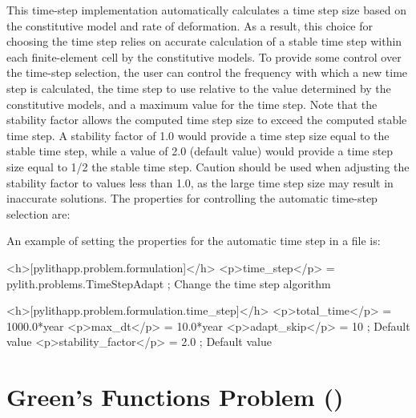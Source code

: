 This time-step implementation automatically calculates a time step
size based on the constitutive model and rate of deformation. As a
result, this choice for choosing the time step relies on accurate
calculation of a stable time step within each finite-element cell
by the constitutive models. To provide some control over the time-step
selection, the user can control the frequency with which a new time
step is calculated, the time step to use relative to the value determined
by the constitutive models, and a maximum value for the time step.
Note that the stability factor allows the computed time step size
to exceed the computed stable time step. A stability factor of 1.0
would provide a time step size equal to the stable time step, while
a value of 2.0 (default value) would provide a time step size equal
to 1/2 the stable time step. Caution should be used when adjusting
the stability factor to values less than 1.0, as the large time step
size may result in inaccurate solutions. The properties for controlling
the automatic time-step selection are:
\begin{inventory}
\end{inventory}
An example of setting the properties for the automatic time step in
a  file is:
\begin{cfg}
<h>[pylithapp.problem.formulation]</h>
<p>time_step</p> = pylith.problems.TimeStepAdapt ; Change the time step algorithm

<h>[pylithapp.problem.formulation.time_step]</h>
<p>total_time</p> = 1000.0*year
<p>max_dt</p> = 10.0*year
<p>adapt_skip</p> = 10 ; Default value
<p>stability_factor</p> = 2.0 ; Default value
\end{cfg}

\section{Green's Functions Problem ()}

